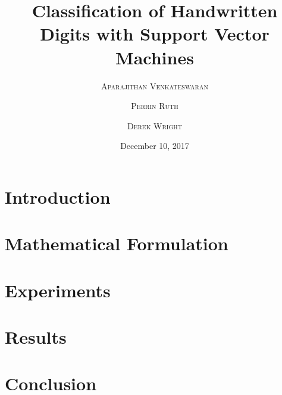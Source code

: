 \documentclass[twoside,twocolumn]{article}
\title{Classification of Handwritten Digits with Support Vector Machines} %
\author{%
\textsc{Aparajithan Venkateswaran} \\[1ex] %
\and %
\textsc{Perrin Ruth} \\[1ex] %
\and %
\textsc{Derek Wright} \\[1ex] %
}
\date{December 10, 2017} %
\begin{document}
\maketitle


\section{Introduction}




\section{Mathematical Formulation}




\section{Experiments}




\section{Results}




\section{Conclusion}



%
%

\nocite{*}



\end{document}
